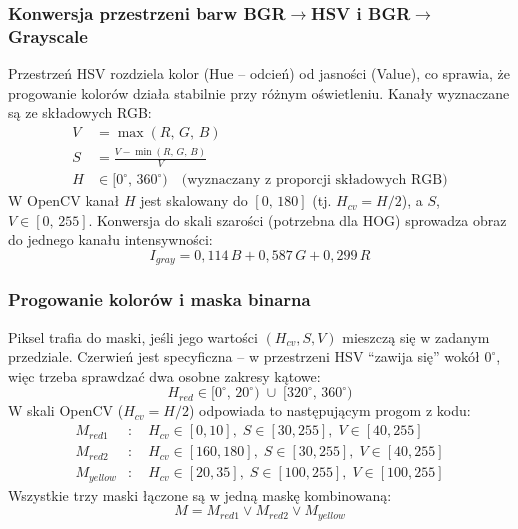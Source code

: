 \documentclass[12pt,oneside]{article}
\begin{document}
\subsubsection{Konwersja przestrzeni barw BGR\texorpdfstring{$\to$}{->}HSV
              i BGR\texorpdfstring{$\to$}{->}Grayscale}
Przestrzeń HSV rozdziela kolor (Hue -- odcień) od jasności (Value), co sprawia, że
progowanie kolorów działa stabilnie przy różnym oświetleniu. Kanały wyznaczane są ze
składowych RGB:
\begin{align}
    V &= \max(R,\,G,\,B) \label{eq:hsv_v}\\
    S &= \frac{V - \min(R,\,G,\,B)}{V} \label{eq:hsv_s}\\
    H &\in [0^\circ,\, 360^\circ) \quad\text{(wyznaczany z proporcji składowych RGB)}
    \label{eq:hsv_h}
\end{align}
W OpenCV kanał $H$ jest skalowany do $[0,\,180]$ (tj. $H_{cv} = H/2$), a $S$, $V \in
[0,\,255]$. Konwersja do skali szarości (potrzebna dla HOG) sprowadza obraz do jednego
kanału intensywności:
\begin{equation}
    I_{gray} = 0{,}114\,B + 0{,}587\,G + 0{,}299\,R
    \label{eq:gray}
\end{equation}

\subsubsection{Progowanie kolorów i maska binarna}
Piksel trafia do maski, jeśli jego wartości $(H_{cv}, S, V)$ mieszczą się w zadanym
przedziale. Czerwień jest specyficzna -- w przestrzeni HSV ``zawija się'' wokół
$0^\circ$, więc trzeba sprawdzać dwa osobne zakresy kątowe:
\begin{equation}
    H_{red} \in [0^\circ,\, 20^\circ) \;\cup\; [320^\circ,\, 360^\circ)
\end{equation}
W skali OpenCV ($H_{cv} = H/2$) odpowiada to następującym progom z kodu:
\begin{align}
    M_{red1}   &:\quad H_{cv}\!\in[0,10],\; S\!\in[30,255],\; V\!\in[40,255]
               \label{eq:red1}\\
    M_{red2}   &:\quad H_{cv}\!\in[160,180],\; S\!\in[30,255],\; V\!\in[40,255]
               \label{eq:red2}\\
    M_{yellow} &:\quad H_{cv}\!\in[20,35],\; S\!\in[100,255],\; V\!\in[100,255]
               \label{eq:yellow}
\end{align}
Wszystkie trzy maski łączone są w jedną maskę kombinowaną:
\begin{equation}
    M = M_{red1} \lor M_{red2} \lor M_{yellow}
    \label{eq:mask}
\end{equation}
\end{document}
